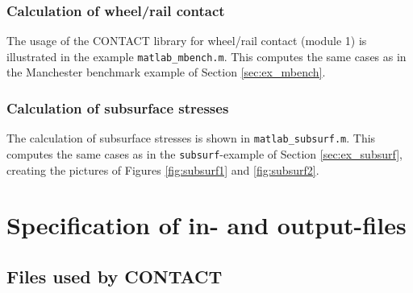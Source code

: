\documentclass[12pt]{report}
\begin{document}
\subsection{Calculation of wheel/rail contact}
\label{sec:clib_mbench}

The usage of the CONTACT library for wheel/rail contact (module 1) is
illustrated in the example {\tt matlab\_mbench.m}. This computes the same
cases as in the Manchester benchmark example of Section
\ref{sec:ex_mbench}.

\subsection{Calculation of subsurface stresses}
\label{sec:clib_ex_subs}

The calculation of subsurface stresses is shown in {\tt matlab\_subsurf.m}. 
This computes the same cases as in the {\tt subsurf}-example of Section
\ref{sec:ex_subsurf}, creating the pictures of Figures \ref{fig:subsurf1} and
\ref{fig:subsurf2}.

\color{black}


\clearpage






\clearpage
\appendix

\chapter{Specification of in- and output-files}
\label{chp:fileformats}

\section{Files used by CONTACT}
\end{document}
